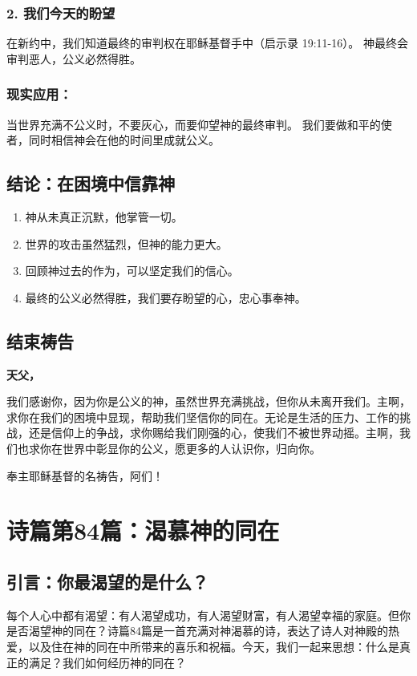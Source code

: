 \documentclass[a4paper, 12pt]{article}
\begin{document}
\subsubsection*{2. 我们今天的盼望}
在新约中，我们知道最终的审判权在耶稣基督手中（启示录 19:11-16）。
神最终会审判恶人，公义必然得胜。
\subsubsection*{现实应用：}

当世界充满不公义时，不要灰心，而要仰望神的最终审判。
我们要做和平的使者，同时相信神会在他的时间里成就公义。
\subsection*{结论：在困境中信靠神}
\begin{enumerate}
    \item 神从未真正沉默，他掌管一切。

    \item 世界的攻击虽然猛烈，但神的能力更大。


    \item 回顾神过去的作为，可以坚定我们的信心。
    \item 最终的公义必然得胜，我们要存盼望的心，忠心事奉神。

\end{enumerate}
\subsection*{结束祷告}
\textbf{天父，}

我们感谢你，因为你是公义的神，虽然世界充满挑战，但你从未离开我们。主啊，求你在我们的困境中显现，帮助我们坚信你的同在。无论是生活的压力、工作的挑战，还是信仰上的争战，求你赐给我们刚强的心，使我们不被世界动摇。主啊，我们也求你在世界中彰显你的公义，愿更多的人认识你，归向你。

奉主耶稣基督的名祷告，阿们！
\newpage
\section{诗篇第84篇：渴慕神的同在}
\subsection*{引言：你最渴望的是什么？}
每个人心中都有渴望：有人渴望成功，有人渴望财富，有人渴望幸福的家庭。但你是否渴望神的同在？诗篇84篇是一首充满对神渴慕的诗，表达了诗人对神殿的热爱，以及住在神的同在中所带来的喜乐和祝福。今天，我们一起来思想：什么是真正的满足？我们如何经历神的同在？
\end{document}
